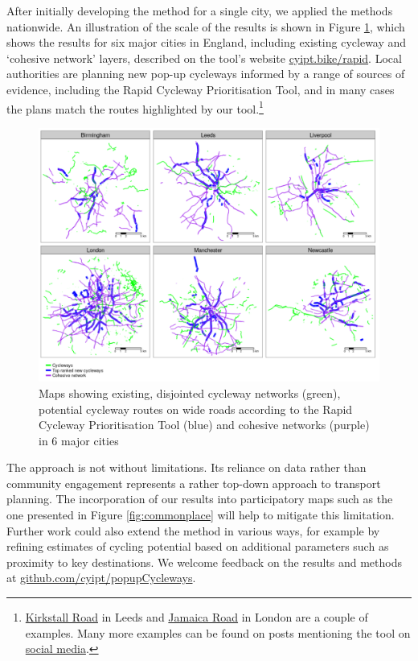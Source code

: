 \documentclass[
]{article}
\begin{document}
After initially developing the method for a single city, we applied the methods nationwide.
An illustration of the scale of the results is shown in Figure \ref{fig:facet}, which shows the results for six major cities in England, including existing cycleway and `cohesive network' layers, described on the tool's website \href{https://www.cyipt.bike/rapid/}{cyipt.bike/rapid}.
Local authorities are planning new pop-up cycleways informed by a range of sources of evidence, including the Rapid Cycleway Prioritisation Tool, and in many cases the plans match the routes highlighted by our tool.\footnote{
  \href{https://www.bbc.co.uk/news/uk-england-leeds-52577554}{Kirkstall Road} in Leeds and \href{https://www.se16.com/6208-work-starts-on-54m-cycleway-along-jamaica-road}{Jamaica Road} in London are a couple of examples.
  Many more examples can be found on posts mentioning the tool on \href{https://twitter.com/search?q=cyipt.bike\%2Frapid}{social media}.}

\begin{figure}
\includegraphics[width=1\linewidth]{figures/facet-output} \caption{Maps showing existing, disjointed cycleway networks (green), potential cycleway routes on wide roads according to the Rapid Cycleway Prioritisation Tool (blue) and cohesive networks (purple) in 6 major cities}\label{fig:facet}
\end{figure}

The approach is not without limitations.
Its reliance on data rather than community engagement represents a rather top-down approach to transport planning.
The incorporation of our results into participatory maps such as the one presented in Figure \ref{fig:commonplace} will help to mitigate this limitation.
Further work could also extend the method in various ways, for example by refining estimates of cycling potential based on additional parameters such as proximity to key destinations.
We welcome feedback on the results and methods at \href{https://github.com/cyipt/popupCycleways}{github.com/cyipt/popupCycleways}.
\end{document}
